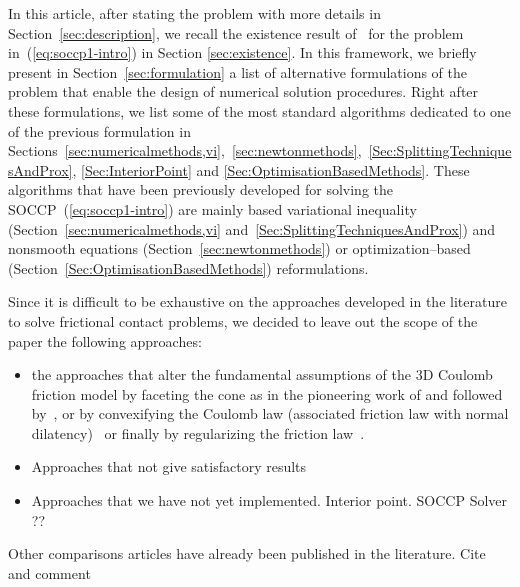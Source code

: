 In this article,  after stating the problem with more details in Section~\ref{sec:description}, we recall the existence result of~\cite{Acary.ea_ZAMM2011} for the problem in~(\ref{eq:soccp1-intro}) in Section \ref{sec:existence}. In this framework, we briefly present in Section~\ref{sec:formulation} a list of alternative formulations of the problem that enable the design of numerical solution procedures. Right after these formulations, we list some of the most standard algorithms dedicated to one of the previous formulation in Sections~\ref{sec:numericalmethods,vi},~\ref{sec:newtonmethods},~\ref{Sec:SplittingTechniquesAndProx}, \ref{Sec:InteriorPoint} and \ref{Sec:OptimisationBasedMethods}. These algorithms that have been previously developed for solving the SOCCP~(\ref{eq:soccp1-intro}) are mainly based  variational inequality (Section~\ref{sec:numericalmethods,vi} and~\ref{Sec:SplittingTechniquesAndProx}) and nonsmooth equations (Section~\ref{sec:newtonmethods}) or  optimization--based (Section~\ref{Sec:OptimisationBasedMethods}) reformulations.  

Since it is difficult to be exhaustive on the approaches developed in the literature to solve frictional contact problems, we decided to leave out the scope of the paper the following approaches:
\begin{itemize}
\item the approaches that alter the fundamental assumptions of the 3D Coulomb friction model by faceting the cone as in the pioneering work of \cite{Klarbring1986} and followed by~\cite{AlFahed.Stavroulakis.ea1991,Pang.Trinkle1996,Stewart.Trinkle1996,Anitescu.Potra97,Haslinger.ea_JCAM2004}, or by convexifying the Coulomb law (associated friction law with normal dilatency)~\cite{Heyn.ea_IJNME2013,Tasora.Anistescu_Meccanica2013,Tasora.Anistescu_CMAME2011,Anistescu.Tasora_COA2010,Tasora.Anistescu_CMAME2009} or finally by regularizing the friction law~\cite{Kikuchi.Oden_SIAM1988}.
\item Approaches that not give satisfactory results
\item Approaches that we have not yet implemented. Interior point. SOCCP Solver ??
\end{itemize}

Other comparisons articles have already been published in the literature. Cite and comment

\begin{list}{}{}
\item \cite{Raous.ea1988,Chabrand.ea_MCM1998}
\item \cite{Christensen.Klarbring.ea1998}
\item \cite{Mijar.Arora_SMO2000,Mijar.Arora_ACME2000,Mirar.Arora_SMO2004-I,Mirar.Arora_SMO2004-II}
\end{list}


